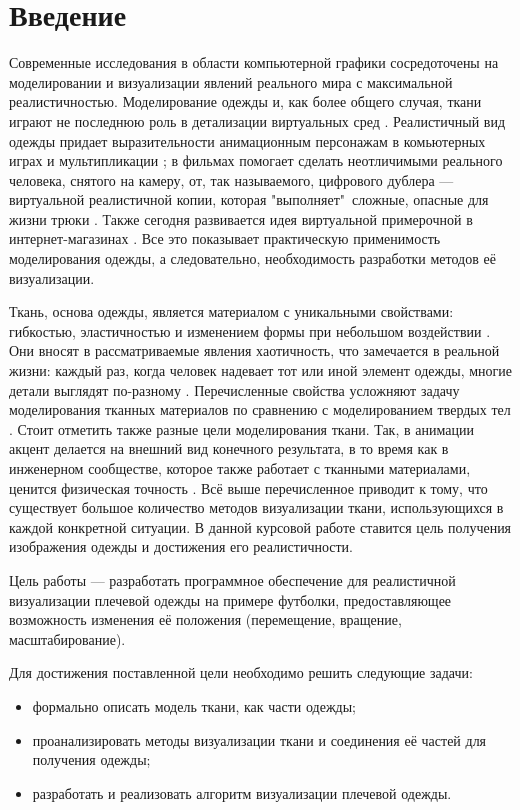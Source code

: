 \chapter*{Введение}

Современные исследования в области компьютерной графики сосредоточены на
моделировании и визуализации явлений реального мира с максимальной
реалистичностью. Моделирование одежды и, как более общего случая, ткани играют
не последнюю роль в детализации виртуальных сред \cite{bib01}.
Реалистичный вид одежды придает выразительности анимационным персонажам в
комьютерных играх и мультипликации \cite{bib02}; в фильмах
помогает сделать неотличимыми реального человека, снятого на камеру, от, так
называемого, цифрового дублера --- виртуальной реалистичной копии, которая
"выполняет"\ сложные,  опасные для жизни трюки \cite{bib03}. Также
сегодня развивается идея виртуальной примерочной в интернет-магазинах
\cite{bib04}. Все это показывает практическую применимость
моделирования одежды, а следовательно, необходимость разработки методов её
визуализации.

Ткань, основа одежды, является материалом с уникальными свойствами: гибкостью,
эластичностью и изменением формы при небольшом воздействии
\cite{bib05}. Они вносят в рассматриваемые явления хаотичность,
что  замечается в реальной жизни: каждый раз, когда человек надевает тот или
иной элемент одежды, многие детали выглядят по-разному
\cite{bib06}.  Перечисленные свойства усложняют задачу
моделирования тканных материалов по сравнению с моделированием твердых тел
\cite{bib07}. Стоит отметить также разные цели моделирования ткани.
Так, в анимации акцент делается на внешний вид конечного результата, в то время
как в инженерном сообществе, которое также работает с тканными материалами,
ценится физическая точность \cite{bib03}. Всё выше перечисленное
приводит к тому, что существует большое количество методов визуализации ткани,
использующихся в каждой конкретной ситуации. В данной курсовой работе ставится
цель получения изображения одежды и достижения его реалистичности.

Цель работы --- разработать программное обеспечение для реалистичной
визуализации плечевой одежды на примере футболки, предоставляющее возможность
изменения её положения (перемещение, вращение, масштабирование).

Для достижения поставленной цели необходимо решить следующие задачи:
\begin{itemize}[left=\parindent]
    \item  формально описать модель ткани, как части одежды;
    \item  проанализировать методы визуализации ткани и соединения её частей
           для получения одежды;
    \item  разработать и реализовать алгоритм визуализации плечевой одежды.
\end{itemize}


